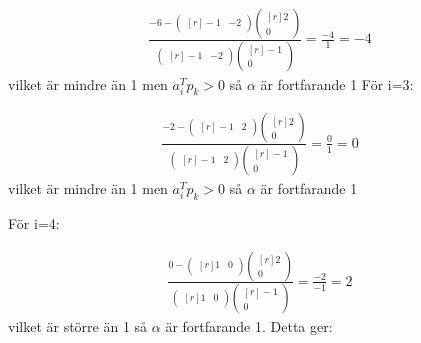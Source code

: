 \begin{equation*}
\begin{aligned}
\frac{-6-
  \begin{pmatrix*}[r]
   -1  &
   -2
\end{pmatrix*}
  \begin{pmatrix*}[r]
   2  \\
   0
\end{pmatrix*}
}{
  \begin{pmatrix*}[r]
   -1  &
   -2
\end{pmatrix*}
  \begin{pmatrix*}[r]
   -1  \\
   0
\end{pmatrix*}}=\frac{-4}{1}=-4
\end{aligned}
\end{equation*}
vilket är mindre än 1 men $a_i^Tp_k>0$ så $\alpha $ är fortfarande 1
För i=3:

\begin{equation*}
\begin{aligned}
\frac{-2-
  \begin{pmatrix*}[r]
   -1  &
   2
\end{pmatrix*}
  \begin{pmatrix*}[r]
   2  \\
   0
\end{pmatrix*}
}{
  \begin{pmatrix*}[r]
   -1  &
   2
\end{pmatrix*}
  \begin{pmatrix*}[r]
   -1  \\
   0
\end{pmatrix*}}=\frac{0}{1}=0
\end{aligned}
\end{equation*}
vilket är mindre än 1 men $a_i^Tp_k>0$ så $\alpha $ är fortfarande 1

För i=4:

\begin{equation*}
\begin{aligned}
\frac{0-
  \begin{pmatrix*}[r]
   1  &
   0
\end{pmatrix*}
  \begin{pmatrix*}[r]
   2  \\
   0
\end{pmatrix*}
}{
  \begin{pmatrix*}[r]
   1  &
   0
\end{pmatrix*}
  \begin{pmatrix*}[r]
   -1  \\
   0
\end{pmatrix*}}=\frac{-2}{-1}=2
\end{aligned}
\end{equation*}
vilket är större än 1 så $\alpha $ är fortfarande 1. Detta ger:

